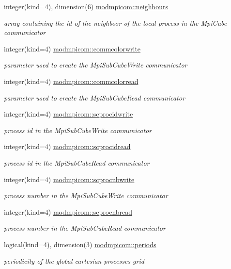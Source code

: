 \begin{DoxyCompactItemize}
integer(kind=4), dimension(6) \hyperlink{namespacemodmpicom_a818e6dbfc3705e5d5bddb752f2aeb5aa}{modmpicom\+::neighbours}
\begin{DoxyCompactList}\small\item\em array containing the id of the neighboor of the local process in the Mpi\+Cube communicator \end{DoxyCompactList}\item 
integer(kind=4) \hyperlink{namespacemodmpicom_a10897435b88ede934389b5099b4a2f7f}{modmpicom\+::commcolorwrite}
\begin{DoxyCompactList}\small\item\em parameter used to create the Mpi\+Sub\+Cube\+Write communicator \end{DoxyCompactList}\item 
integer(kind=4) \hyperlink{namespacemodmpicom_a0ba0397b7d92b456e11a65bce1f86e7c}{modmpicom\+::commcolorread}
\begin{DoxyCompactList}\small\item\em parameter used to create the Mpi\+Sub\+Cube\+Read communicator \end{DoxyCompactList}\item 
integer(kind=4) \hyperlink{namespacemodmpicom_a0bade7a409f7af1432be0253a6262442}{modmpicom\+::scprocidwrite}
\begin{DoxyCompactList}\small\item\em process id in the Mpi\+Sub\+Cube\+Write communicator \end{DoxyCompactList}\item 
integer(kind=4) \hyperlink{namespacemodmpicom_a23d8fed28f6705c564d6a10038de36c7}{modmpicom\+::scprocidread}
\begin{DoxyCompactList}\small\item\em process id in the Mpi\+Sub\+Cube\+Read communicator \end{DoxyCompactList}\item 
integer(kind=4) \hyperlink{namespacemodmpicom_a8281c8567826b44d76d7a801203c99a8}{modmpicom\+::scprocnbwrite}
\begin{DoxyCompactList}\small\item\em process number in the Mpi\+Sub\+Cube\+Write communicator \end{DoxyCompactList}\item 
integer(kind=4) \hyperlink{namespacemodmpicom_a8fde31beaf4b43228d7f93325630cefa}{modmpicom\+::scprocnbread}
\begin{DoxyCompactList}\small\item\em process number in the Mpi\+Sub\+Cube\+Read communicator \end{DoxyCompactList}\item 
logical(kind=4), dimension(3) \hyperlink{namespacemodmpicom_a0347e6d8a15028132a57953e6ff823a2}{modmpicom\+::periods}
\begin{DoxyCompactList}\small\item\em periodicity of the global cartesian processes grid \end{DoxyCompactList}\end{DoxyCompactItemize}


